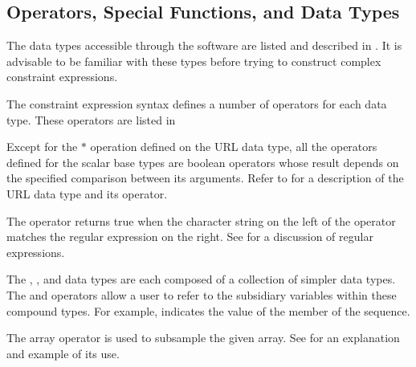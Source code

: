 \subsection{Operators, Special Functions, and Data Types}

The data types accessible through the \opendap software are listed and
described in . It is advisable to be familiar
with these types before trying to construct complex constraint
expressions.

The constraint expression syntax defines a number of operators for each
data type. These operators are listed in 

\indc{\lit{*}} Except for the $*$ operation defined on the URL data
type, all the operators defined for the scalar base types are boolean
operators whose result depends on the specified comparison between its
arguments. Refer to  for a description
of the URL data type and its operator.

The \math[\~{}=]{\sim =} operator returns true when the character string
on the left of the operator matches the regular expression on the
right. See  for a discussion of
regular expressions.

The , , and  data types
are each composed of a collection of simpler data types. The 
and operators allow a user to refer to the subsidiary variables within
these compound types. For example,  indicates the
value of the  member of the  sequence.

The array operator \ind{$[]$} is used to subsample the given array.
See  for an explanation and example of
its use.


